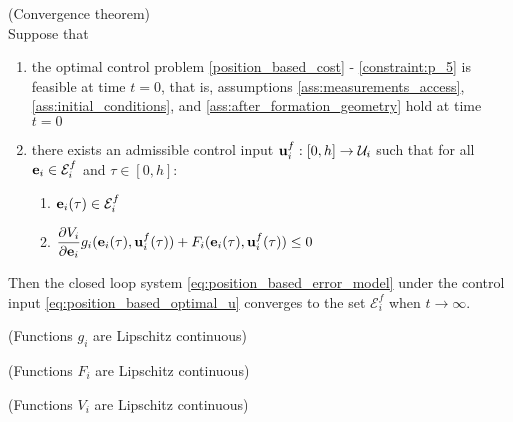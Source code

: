 \begin{bw_box}
\begin{theorem} (Convergence theorem)\\

  Suppose that

  \begin{enumerate}
    \item the optimal control problem \eqref{position_based_cost} -
      \eqref{constraint:p_5} is feasible at time $t=0$, that is, assumptions
      \eqref{ass:measurements_access}, \eqref{ass:initial_conditions}, and
      \eqref{ass:after_formation_geometry} hold at time $t=0$
    \item there exists an admissible control input
      $\bm{\mathbf{u}}_i^f : [0, h] \to \mathcal{U}_i$ such that for all
      $\bm{\mathbf{e}}_i \in \mathcal{E}_i^f$ and $\tau \in [0,h]$:

      \begin{enumerate}
        \item $\bm{\mathbf{e}}_i(\tau) \in \mathcal{E}_i^f$
        \item $\dfrac{\partial V_i}{\partial \bm{\mathbf{e}}_i} g_i(\bm{\mathbf{e}}_i(\tau), \bm{\mathbf{u}}_i^f(\tau)) + F_i(\bm{\mathbf{e}}_i(\tau), \bm{\mathbf{u}}_i^f(\tau)) \leq 0$
      \end{enumerate}

  \end{enumerate}

  Then the closed loop system \eqref{eq:position_based_error_model} under the
  control input \eqref{eq:position_based_optimal_u} converges to the set
  $\mathcal{E}_i^f$ when $t \to \infty$.

\end{theorem}
\end{bw_box}



\begin{gg_box}
\begin{assumption} (Functions $g_i$ are Lipschitz continuous)
  \label{ass:g_i_Lipschitz}
\end{assumption}
\end{gg_box}

\begin{gg_box}
\begin{assumption} (Functions $F_i$ are Lipschitz continuous)
  \label{ass:F_i_Lipschitz}
\end{assumption}
\end{gg_box}


\begin{gg_box}
\begin{assumption} (Functions $V_i$ are Lipschitz continuous)
  \label{ass:V_i_Lipschitz}
\end{assumption}
\end{gg_box}
